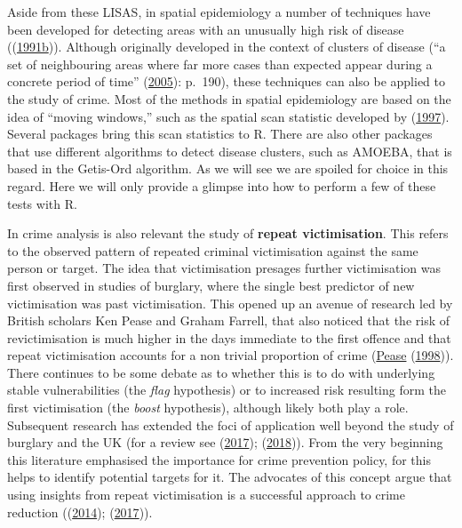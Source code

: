 \documentclass[
  krantz2]{krantz}
\begin{document}
Aside from these LISAS, in spatial epidemiology a number of techniques have been developed for detecting areas with an unusually high risk of disease ((\protect\hyperlink{ref-Marshall_1991b}{1991b})). Although originally developed in the context of clusters of disease (``a set of neighbouring areas where far more cases than expected appear during a concrete period of time'' (\protect\hyperlink{ref-Gomez_2005}{2005}): p.~190), these techniques can also be applied to the study of crime. Most of the methods in spatial epidemiology are based on the idea of ``moving windows,'' such as the spatial scan statistic developed by (\protect\hyperlink{ref-Kulldorff_1997}{1997}). Several packages bring this scan statistics to R. There are also other packages that use different algorithms to detect disease clusters, such as AMOEBA, that is based in the Getis-Ord algorithm. As we will see we are spoiled for choice in this regard. Here we will only provide a glimpse into how to perform a few of these tests with R.

In crime analysis is also relevant the study of \textbf{repeat victimisation}. This refers to the observed pattern of repeated criminal victimisation against the same person or target. The idea that victimisation presages further victimisation was first observed in studies of burglary, where the single best predictor of new victimisation was past victimisation. This opened up an avenue of research led by British scholars Ken Pease and Graham Farrell, that also noticed that the risk of revictimisation is much higher in the days immediate to the first offence and that repeat victimisation accounts for a non trivial proportion of crime (\protect\hyperlink{ref-Pease_1998}{Pease} (\protect\hyperlink{ref-Pease_1998}{1998})). There continues to be some debate as to whether this is to do with underlying stable vulnerabilities (the \emph{flag} hypothesis) or to increased risk resulting form the first victimisation (the \emph{boost} hypothesis), although likely both play a role. Subsequent research has extended the foci of application well beyond the study of burglary and the UK (for a review see (\protect\hyperlink{ref-Pease_2017}{2017}); (\protect\hyperlink{ref-Pease_2018}{2018})). From the very beginning this literature emphasised the importance for crime prevention policy, for this helps to identify potential targets for it. The advocates of this concept argue that using insights from repeat victimisation is a successful approach to crime reduction ((\protect\hyperlink{ref-Grove_2014}{2014}); (\protect\hyperlink{ref-Farrell_2017}{2017})).
\end{document}
